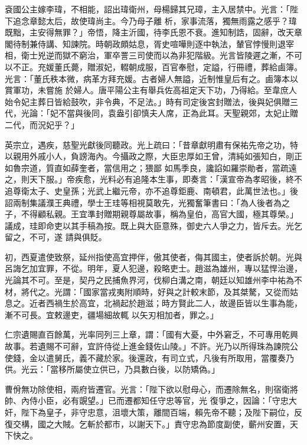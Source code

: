 \begin{pinyinscope}
 袞國公主嫁李瑋，不相能，詔出瑋衛州，母楊歸其兄璋，主入居禁中。光言：「陛下追念章懿太后，故使瑋尚主。今乃母子離
 析，家事流落，獨無雨露之感乎？瑋既黜，主安得無罪？」帝悟，降主沂國，待李氏恩不衰。進知制誥，固辭，改天章閣待制兼侍講、知諫院。時朝政頗姑息，胥史喧嘩則逐中執法，輦官悖慢則退宰相，衛士兇逆而獄不窮治，軍卒詈三司使而以為非犯階級。光言皆陵遲之漸，不可以不正。充媛董氏薨，贈淑妃，輟朝成服，百官奉慰，定謚，行冊禮，葬給鹵簿。光言：「董氏秩本微，病革方拜充媛。古者婦人無謚，近制惟皇后有之。鹵簿本以賞軍功，未嘗施
 於婦人。唐平陽公主有舉兵佐高祖定天下功，乃得給。至韋庶人始令妃主葬日皆給鼓吹，非令典，不足法。」時有司定後宮封贈法，後與妃俱贈三代，光論：「妃不當與後同，袁盎引卻慎夫人席，正為此耳。天聖親郊，太妃止贈二代，而況妃乎？」



 英宗立，遇疾，慈聖光獻後同聽政。光上疏曰：「昔章獻明肅有保祐先帝之功，特以親用外戚小人，負謗海內。今攝政之際，大臣忠厚如王曾，清純如張知白，剛正如魯宗道，質直如薛奎者，當信用之；猥鄙
 如馬季良，讒諂如羅崇勛者，當疏遠之，則天下服。」帝疾愈，光料必有追隆本生事，即奏言：「漢宣帝為孝昭後，終不追尊衛太子、史皇孫；光武上繼元帝，亦不追尊鉅鹿、南頓君，此萬世法也。」後詔兩制集議濮王典禮，學士王珪等相視莫敢先，光獨奮筆書曰：「為人後者為之子，不得顧私親。王宜準封贈期親尊屬故事，稱為皇伯，高官大國，極其尊榮。」議成，珪即命吏以其手稿為按。既上與大臣意殊，御史六人爭之力，皆斥去。光乞留之，不可，遂
 請與俱貶。



 初，西夏遣使致祭，延州指使高宜押伴，傲其使者，侮其國主，使者訴於朝。光與呂誨乞加宜罪，不從。明年，夏人犯邊，殺略吏士。趙滋為雄州，專以猛悍治邊，光論其不可。至是，契丹之民捕魚界河，伐柳白溝之南，朝廷以知雄州李中祐為不材，將代之。光謂：「國家當戎夷附順時，好與之計較末節，及其桀驁，又從而姑息之。近者西禍生於高宜，北禍起於趙滋；時方賢此二人，故邊臣皆以生事為能，漸不可長。宜敕邊吏，疆場細故輒
 以矢刃相加者，罪之。」



 仁宗遺賜直百餘萬，光率同列三上章，謂：「國有大憂，中外窘乏，不可專用乾興故事。若遺賜不可辭，宜許侍從上進金錢佐山陵。」不許。光乃以所得珠為諫院公使錢，金以遣舅氏，義不藏於家。後還政，有司立式，凡後有所取用，當覆奏乃供。光云：「當移所屬使立供已，乃具數白後，以防矯偽。」



 曹佾無功除使相，兩府皆遷官。光言：「陛下欲以慰母心，而遷除無名，則宿衛將帥、內侍小臣，必有覬望。」已而遷都知任守忠等官，光
 復爭之，因論：「守忠大奸，陛下為皇子，非守忠意，沮壞大策，離間百端，賴先帝不聽；及陛下嗣位，反復交構，國之大賊。乞斬於都市，以謝天下。」責守忠為節度副使，蘄州安置，天下快之。




\end{pinyinscope}
